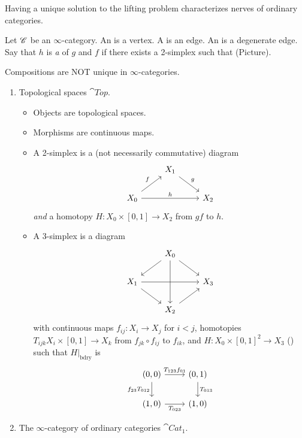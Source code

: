 \begin{remark}
	Having a unique solution to the lifting problem characterizes nerves of ordinary categories.
\end{remark}
\begin{definition}
	Let $\mathscr C$ be an $\infty$-category. An  is a vertex. A  is an edge. An  is a degenerate edge. Say that $h$ is \emph{a}  of $g$ and $f$ if there exists a 2-simplex such that (Picture).
\end{definition}
\begin{remark}
	Compositions are NOT unique in $\infty$-categories.
\end{remark}
\begin{example} \leavevmode
	\begin{enumerate}[1)]
		\item Topological spaces $\cat{Top}$.
			\begin{itemize}
				\item Objects are topological spaces.
				\item Morphisms are continuous maps.
				\item A 2-simplex is a (not necessarily commutative) diagram
					\[
					\begin{tikzcd}
						& X_1 \ar[dr,"g"] \\
						X_0 \ar[ur,"f"] \ar[rr,"h"] & & X_2
					\end{tikzcd}
					\] 
					\emph{and} a homotopy $H:X_0\times [0,1]\to X_2$ from $gf$ to $h$.
				\item A 3-simplex is a diagram
					\[
					\begin{tikzcd}
						& X_0 \ar[dl] \ar[dr] \ar[dd] \\
						X_1 \ar[rr] \ar[dr] & & X_3 \\
								    & X_2 \ar[ur]
					\end{tikzcd}
					\]
					with continuous maps $f_{ij}:X_i\to X_j$ for $i<j$, homotopies $T_{ijk}X_i\times [0,1]\to X_k$ from $f_{jk}\circ f_{ij}$ to $f_{ik}$, and $H:X_0\times [0,1]^2\to X_3$ () such that $H|_{\text{bdry}}$ is
					\[
					\begin{tikzcd}
						(0,0) \ar[r,"T_{123}f_{01}"] \ar[d,"f_{23}T_{012}"'] & (0,1) \ar[d,"T_{013}"] \\
						(1,0) \ar[r,"T_{023}"'] & (1,0)
					\end{tikzcd}
					\] 
			\end{itemize}
		\item The $\infty$-category of ordinary categories $\cat{Cat}_1$.

\end{enumerate}
\end{example}
